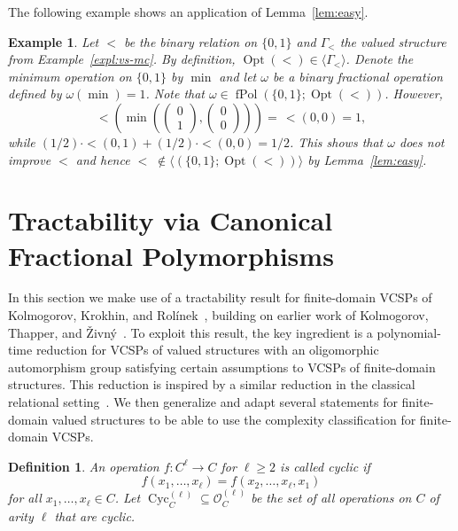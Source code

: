 \documentclass[nonacm]{acmart}
\DeclareMathOperator{\Cyc}{Cyc}
\DeclareMathOperator{\fPol}{fPol}
\DeclareMathOperator{\Opt}{Opt}
\newtheorem{definition}[theorem]{Definition}
\newtheorem{expl}[theorem]{Example}
\begin{document}
The following example shows an application of Lemma~\ref{lem:easy}.


\begin{expl}
Let $<$ be the binary relation on $\{0,1\}$ and $\Gamma_<$ the valued structure from Example~\ref{expl:vs-mc}. By definition, $\Opt(<) \in \langle \Gamma_< \rangle$. Denote the minimum operation on $\{0,1\}$ by $\min$ and let $\omega$ be a binary fractional operation defined by $\omega(\min)=1$. Note that $\omega \in \fPol(\{0,1\}; \Opt(<))$. However, 
\[< \left(\min \left( \begin{pmatrix}0\\1\end{pmatrix} , \begin{pmatrix}0\\0\end{pmatrix} \right) \right)= \, {<}(0, 0) = 1,\]
while $(1/2) \cdot {<}(0,1) + (1/2) \cdot {<}(0,0)= 1/2$. This shows that $\omega$ does not improve $<$ and hence $< \; \not \in \langle (\{0,1\}; \Opt(<)) \rangle$ by Lemma~\ref{lem:easy}. 
\end{expl}


\section{Tractability via Canonical Fractional Polymorphisms} \label{sect:tract}

In this section we make use of a tractability result for finite-domain VCSPs of
Kolmogorov, Krokhin, and Rol\'{i}nek~\cite{KolmogorovKR17},  building on earlier work of Kolmogorov, Thapper, and 
\v{Z}ivn\'y~\cite{KolmogorovThapperZivny15,ThapperZivny13}. To exploit this result, the key ingredient is a polynomial-time reduction for VCSPs of valued structures with an oligomorphic automorphism group satisfying certain assumptions to VCSPs of finite-domain structures. This reduction is inspired by a similar reduction in the classical relational setting~\cite{BodMot-Unary}. We then generalize and adapt several statements for finite-domain valued structures to be able to use the complexity classification for finite-domain VCSPs.

\begin{definition}
An operation $f \colon C^{\ell} \to C$ for $\ell \geq 2$ is called 
\emph{cyclic}
if $$f(x_1,\dots,x_{\ell}) = f(x_2,\dots,x_{\ell},x_1)$$ for all $x_1,\dots,x_{\ell} \in C$.
Let $\Cyc_C^{(\ell)} \subseteq {\mathscr O}_C^{(\ell)}$ be the set of all operations on $C$ of arity $\ell$ that are cyclic.
\end{definition} 
\end{document}

